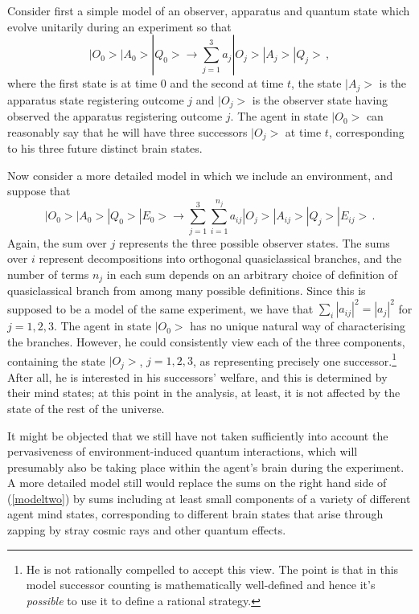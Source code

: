 \documentclass[aps,
pra,epsfig]{revtex4}
\begin{document}
Consider first a simple model of 
an observer, apparatus and quantum state which evolve
unitarily during an experiment so that \begin{equation} | O_0 > | A_0
> | Q_0 > \rightarrow \sum_{j=1}^3 a_j | O_j > | A_j > | Q_j > \, ,
\end{equation} where the first state is at time $0$ and the second at
time $t$, the state $ | A_j > $ is the apparatus state registering
outcome $j$ and $ | O_j > $ is the observer state having observed the
apparatus registering outcome $j$.  The agent in state $ | O_0 >$ can
reasonably say that he will have three successors $ | O_j >$ at time
$t$, corresponding to his three future distinct brain states.

Now consider a more detailed model in which we include an environment,
and suppose that 
\begin{equation}\label{modeltwo} | O_0 > | A_0 > |
Q_0 > | E_0 > \rightarrow \sum_{j=1}^3 \sum_{i=1}^{n_j} 
a_{ij} | O_j > | A_{ij} > | Q_{j}> | E_{ij} >  \, .
\end{equation} 
Again, the sum over $j$ represents the three possible
observer states.  The sums over $i$ represent
decompositions into orthogonal quasiclassical branches, and the number
of terms $n_j$ in each sum depends on an arbitrary choice 
of definition of quasiclassical branch from among many possible 
definitions.  Since this is supposed to be a model of
the same experiment, we have that $ \sum_i | a_{ij} |^2 = | a_j |^2 $
for $j = 1,2,3$.  The agent in state $| O_0 >$ has no unique natural
way of characterising the branches.  However, he could consistently view
each of the three components, containing the state $| O_j >$, $j=1,2,3$,
as representing precisely one successor.\footnote{
He is not rationally compelled to accept this view. 
The point is that in this model successor counting is mathematically 
well-defined and hence it's {\it possible} to use it to define
a rational strategy.}  
After all, he is interested in his successors' welfare, and this is
determined by their mind states; at this point in
the analysis, at least, it is not affected by the state of the rest of the
universe.  

It might be objected that we still have not taken sufficiently into
account the pervasiveness of environment-induced quantum interactions,
which will presumably also be taking place within the agent's brain during the
experiment.  A more detailed model still would replace the sums on the
right hand side of (\ref{modeltwo}) by sums including at least small
components of a variety of different agent mind states, corresponding
to different brain states that arise through zapping by stray cosmic
rays and other quantum effects.
\end{document}

